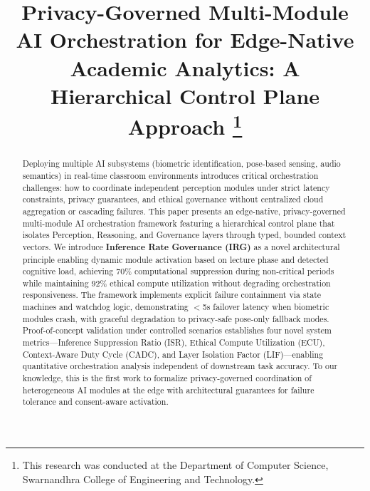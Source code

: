 \documentclass[conference]{IEEEtran}
\begin{document}
\title{Privacy-Governed Multi-Module AI Orchestration for Edge-Native Academic Analytics: A Hierarchical Control Plane Approach
\thanks{This research was conducted at the Department of Computer Science, Swarnandhra College of Engineering and Technology.}
}

\author{
}

\maketitle

\begin{abstract}
Deploying multiple AI subsystems (biometric identification, pose-based sensing, audio semantics) in real-time classroom environments introduces critical orchestration challenges: how to coordinate independent perception modules under strict latency constraints, privacy guarantees, and ethical governance without centralized cloud aggregation or cascading failures. This paper presents an edge-native, privacy-governed multi-module AI orchestration framework featuring a hierarchical control plane that isolates Perception, Reasoning, and Governance layers through typed, bounded context vectors. We introduce \textbf{Inference Rate Governance (IRG)} as a novel architectural principle enabling dynamic module activation based on lecture phase and detected cognitive load, achieving 70\% computational suppression during non-critical periods while maintaining 92\% ethical compute utilization without degrading orchestration responsiveness. The framework implements explicit failure containment via state machines and watchdog logic, demonstrating $<$5s failover latency when biometric modules crash, with graceful degradation to privacy-safe pose-only fallback modes. Proof-of-concept validation under controlled scenarios establishes four novel system metrics—Inference Suppression Ratio (ISR), Ethical Compute Utilization (ECU), Context-Aware Duty Cycle (CADC), and Layer Isolation Factor (LIF)—enabling quantitative orchestration analysis independent of downstream task accuracy. To our knowledge, this is the first work to formalize privacy-governed coordination of heterogeneous AI modules at the edge with architectural guarantees for failure tolerance and consent-aware activation.
\end{abstract}
\end{document}
